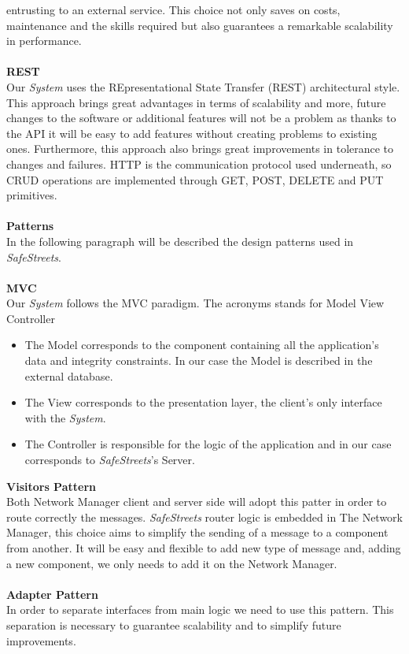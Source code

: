 \documentclass{article}
\begin{document}
entrusting to an external service. This choice not only saves on costs, maintenance and 
the skills required but also guarantees a remarkable scalability in performance.
\\
\\
\textbf{REST} \\
Our \textit{System} uses the REpresentational State Transfer (REST) architectural style. This 
approach brings great advantages in terms of scalability and more, future changes to the software 
or additional features will not be a problem as thanks to the API it will be easy to add features 
without creating problems to existing ones. Furthermore, this approach also brings great improvements 
in tolerance to changes and failures. HTTP is the communication protocol used underneath, 
so CRUD operations are implemented through GET, POST, DELETE and PUT primitives. 
\\
\\
\textbf{Patterns}\\
In the following paragraph will be described the design patterns used in \textit{SafeStreets}. 
\\
\\
\textbf{MVC}\\
Our \textit{System} follows the MVC paradigm. The acronyms stands for Model View Controller

\begin{itemize}
    \item The Model corresponds to the component containing all the application's data and integrity constraints. 
    In our case the Model is described in the external database.
    \item The View corresponds to the presentation layer, the client's only interface with the \textit{System}.
    \item The Controller is responsible for the logic of the application and in our case corresponds to \textit{SafeStreets}'s Server.
\end{itemize}
\textbf{Visitors Pattern}\\
Both Network Manager client and server side will adopt this patter in order to route correctly the messages. \textit{SafeStreets}
router logic is embedded in The Network Manager, this choice aims to simplify the sending of a message to a component
from another. It will be easy and flexible to add new type of message and, adding a new component, we only needs to 
add it on the Network Manager.
\\
\\
\textbf{Adapter Pattern}\\
In order to separate interfaces from main logic we need to use this pattern. This separation is necessary to guarantee
scalability and to simplify future improvements.
\end{document}
